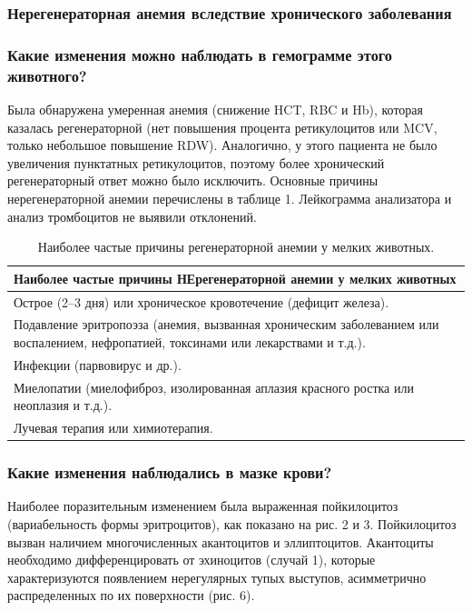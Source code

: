 \documentclass[a4paper,12pt]{book}
\begin{document}
\subsubsection*{Нерегенераторная анемия вследствие хронического заболевания}

\subsubsection*{Какие изменения можно наблюдать в гемограмме этого животного?}
Была обнаружена умеренная анемия (снижение HCT, RBC и Hb), которая казалась регенераторной (нет повышения процента ретикулоцитов или MCV, только небольшое повышение RDW). Аналогично, у этого пациента не было увеличения пунктатных ретикулоцитов, поэтому более хронический регенераторный ответ можно было исключить. Основные причины нерегенераторной анемии перечислены в таблице 1. Лейкограмма анализатора и анализ тромбоцитов не выявили отклонений.

\begin{table}[htbp]
\centering
\caption{Наиболее частые причины регенераторной анемии у мелких животных.}
\begin{tabular}{p{14cm}}
\toprule
Наиболее частые причины НЕрегенераторной анемии у мелких животных \\
\midrule
Острое (2--3 дня) или хроническое кровотечение (дефицит железа). \\
Подавление эритропоэза (анемия, вызванная хроническим заболеванием или воспалением, нефропатией, токсинами или лекарствами и т.д.). \\
Инфекции (парвовирус и др.). \\
Миелопатии (миелофиброз, изолированная аплазия красного ростка или неоплазия и т.д.). \\
Лучевая терапия или химиотерапия. \\
\bottomrule
\end{tabular}
\end{table}

\subsubsection*{Какие изменения наблюдались в мазке крови?}
Наиболее поразительным изменением была выраженная пойкилоцитоз (вариабельность формы эритроцитов), как показано на рис. 2 и 3. Пойкилоцитоз вызван наличием многочисленных акантоцитов и эллиптоцитов. Акантоциты необходимо дифференцировать от эхиноцитов (случай 1), которые характеризуются появлением нерегулярных тупых выступов, асимметрично распределенных по их поверхности (рис. 6).
\end{document}
